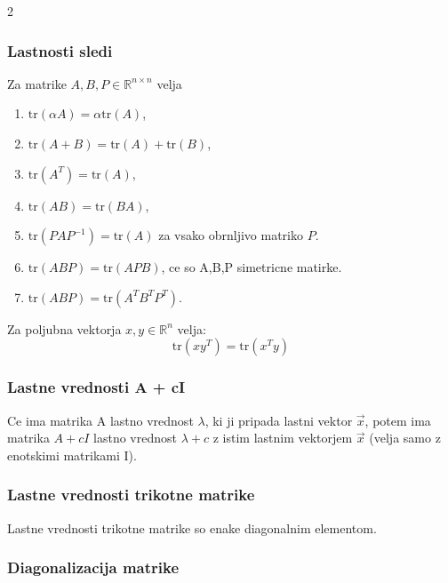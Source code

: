 \documentclass{article}
\begin{document}
\begin{multicols}{2}
	\subsubsection{Lastnosti sledi}

	Za matrike \( A, B, P \in \mathbb{R}^{n \times n} \) velja
	\begin{enumerate}
		\item \( \text{tr}(\alpha A) = \alpha \text{tr}(A) \),
		\item \( \text{tr}(A + B) = \text{tr}(A) + \text{tr}(B) \),
		\item \( \text{tr}(A^T) = \text{tr}(A) \),
		\item \( \text{tr}(AB) = \text{tr}(BA) \),
		\item \( \text{tr}(PAP^{-1}) = \text{tr}(A) \) za vsako obrnljivo matriko \( P \).
		\item \( \text{tr}(ABP) = \text{tr}(APB) \), ce so A,B,P simetricne matirke.
		\item \( \text{tr}(ABP) = \text{tr}(A^TB^TP^T)\).
	\end{enumerate}

	Za poljubna vektorja \( x,y \in \mathbb{R}^n \) velja:
	\[
		\text{tr} (xy^T) = \text{tr}(x^Ty)
	\]


	\subsubsection{Lastne vrednosti A + cI}

	Ce ima matrika A lastno vrednost $\lambda$, ki ji pripada lastni vektor $\vec{x}$,
	potem ima matrika $A + cI$ lastno vrednost $\lambda + c$ z istim lastnim vektorjem $\vec{x}$ (velja samo z
	enotskimi matrikami I).

	\subsubsection{Lastne vrednosti trikotne matrike}

	Lastne vrednosti trikotne matrike so enake diagonalnim elementom.

	\subsubsection{Diagonalizacija matrike}


\end{multicols}
\end{document}
